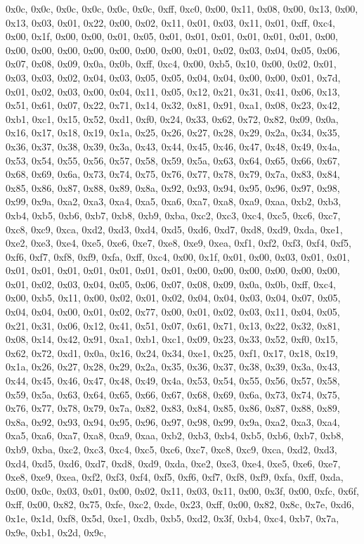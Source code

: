 \documentclass[
]{book}
\begin{document}
0x0c, 0x0c, 0x0c, 0x0c, 0x0c, 0x0c, 0xff, 0xc0, 0x00, 0x11, 0x08, 0x00, 0x13, 0x00, 0x13, 0x03, 0x01, 0x22, 0x00, 0x02, 0x11, 0x01, 0x03, 0x11, 0x01, 0xff, 0xc4, 0x00, 0x1f, 0x00, 0x00, 0x01, 0x05, 0x01, 0x01, 0x01, 0x01, 0x01, 0x01, 0x00, 0x00, 0x00, 0x00, 0x00, 0x00, 0x00, 0x00, 0x01, 0x02, 0x03, 0x04, 0x05, 0x06, 0x07, 0x08, 0x09, 0x0a, 0x0b, 0xff, 0xc4, 0x00, 0xb5, 0x10, 0x00, 0x02, 0x01, 0x03, 0x03, 0x02, 0x04, 0x03, 0x05, 0x05, 0x04, 0x04, 0x00, 0x00, 0x01, 0x7d, 0x01, 0x02, 0x03, 0x00, 0x04,
0x11, 0x05, 0x12, 0x21, 0x31, 0x41, 0x06, 0x13, 0x51, 0x61, 0x07, 0x22, 0x71, 0x14, 0x32, 0x81, 0x91, 0xa1, 0x08, 0x23, 0x42, 0xb1, 0xc1, 0x15, 0x52, 0xd1, 0xf0, 0x24, 0x33, 0x62, 0x72, 0x82, 0x09, 0x0a, 0x16, 0x17, 0x18, 0x19, 0x1a, 0x25, 0x26, 0x27, 0x28, 0x29, 0x2a, 0x34, 0x35, 0x36, 0x37, 0x38, 0x39, 0x3a, 0x43, 0x44, 0x45, 0x46, 0x47, 0x48, 0x49, 0x4a, 0x53, 0x54, 0x55, 0x56, 0x57, 0x58, 0x59, 0x5a, 0x63, 0x64, 0x65, 0x66, 0x67, 0x68, 0x69, 0x6a, 0x73, 0x74, 0x75, 0x76, 0x77, 0x78, 0x79, 0x7a,
0x83, 0x84, 0x85, 0x86, 0x87, 0x88, 0x89, 0x8a, 0x92, 0x93, 0x94, 0x95, 0x96, 0x97, 0x98, 0x99, 0x9a, 0xa2, 0xa3, 0xa4, 0xa5, 0xa6, 0xa7, 0xa8, 0xa9, 0xaa, 0xb2, 0xb3, 0xb4, 0xb5, 0xb6, 0xb7, 0xb8, 0xb9, 0xba, 0xc2, 0xc3, 0xc4, 0xc5, 0xc6, 0xc7, 0xc8, 0xc9, 0xca, 0xd2, 0xd3, 0xd4, 0xd5, 0xd6, 0xd7, 0xd8, 0xd9, 0xda, 0xe1, 0xe2, 0xe3, 0xe4, 0xe5, 0xe6, 0xe7, 0xe8, 0xe9, 0xea, 0xf1, 0xf2, 0xf3, 0xf4, 0xf5, 0xf6, 0xf7, 0xf8, 0xf9, 0xfa, 0xff, 0xc4, 0x00, 0x1f, 0x01, 0x00, 0x03, 0x01, 0x01, 0x01, 0x01,
0x01, 0x01, 0x01, 0x01, 0x01, 0x00, 0x00, 0x00, 0x00, 0x00, 0x00, 0x01, 0x02, 0x03, 0x04, 0x05, 0x06, 0x07, 0x08, 0x09, 0x0a, 0x0b, 0xff, 0xc4, 0x00, 0xb5, 0x11, 0x00, 0x02, 0x01, 0x02, 0x04, 0x04, 0x03, 0x04, 0x07, 0x05, 0x04, 0x04, 0x00, 0x01, 0x02, 0x77, 0x00, 0x01, 0x02, 0x03, 0x11, 0x04, 0x05, 0x21, 0x31, 0x06, 0x12, 0x41, 0x51, 0x07, 0x61, 0x71, 0x13, 0x22, 0x32, 0x81, 0x08, 0x14, 0x42, 0x91, 0xa1, 0xb1, 0xc1, 0x09, 0x23, 0x33, 0x52, 0xf0, 0x15, 0x62, 0x72, 0xd1, 0x0a, 0x16, 0x24, 0x34, 0xe1,
0x25, 0xf1, 0x17, 0x18, 0x19, 0x1a, 0x26, 0x27, 0x28, 0x29, 0x2a, 0x35, 0x36, 0x37, 0x38, 0x39, 0x3a, 0x43, 0x44, 0x45, 0x46, 0x47, 0x48, 0x49, 0x4a, 0x53, 0x54, 0x55, 0x56, 0x57, 0x58, 0x59, 0x5a, 0x63, 0x64, 0x65, 0x66, 0x67, 0x68, 0x69, 0x6a, 0x73, 0x74, 0x75, 0x76, 0x77, 0x78, 0x79, 0x7a, 0x82, 0x83, 0x84, 0x85, 0x86, 0x87, 0x88, 0x89, 0x8a, 0x92, 0x93, 0x94, 0x95, 0x96, 0x97, 0x98, 0x99, 0x9a, 0xa2, 0xa3, 0xa4, 0xa5, 0xa6, 0xa7, 0xa8, 0xa9, 0xaa, 0xb2, 0xb3, 0xb4, 0xb5, 0xb6, 0xb7, 0xb8, 0xb9,
0xba, 0xc2, 0xc3, 0xc4, 0xc5, 0xc6, 0xc7, 0xc8, 0xc9, 0xca, 0xd2, 0xd3, 0xd4, 0xd5, 0xd6, 0xd7, 0xd8, 0xd9, 0xda, 0xe2, 0xe3, 0xe4, 0xe5, 0xe6, 0xe7, 0xe8, 0xe9, 0xea, 0xf2, 0xf3, 0xf4, 0xf5, 0xf6, 0xf7, 0xf8, 0xf9, 0xfa, 0xff, 0xda, 0x00, 0x0c, 0x03, 0x01, 0x00, 0x02, 0x11, 0x03, 0x11, 0x00, 0x3f, 0x00, 0xfc, 0x6f, 0xff, 0x00, 0x82, 0x75, 0xfe, 0xc2, 0xde, 0x23, 0xff, 0x00, 0x82, 0x8c, 0x7e, 0xd6, 0x1e, 0x1d, 0xf8, 0x5d, 0xe1, 0xdb, 0xb5, 0xd2, 0x3f, 0xb4, 0xc4, 0xb7, 0x7a, 0x9e, 0xb1, 0x2d, 0x9c,
\end{document}
